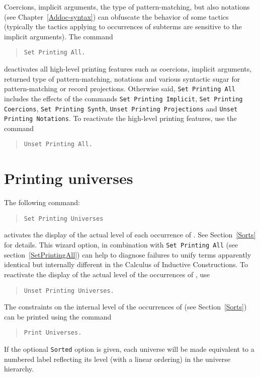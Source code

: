 Coercions, implicit arguments, the type of pattern-matching, but also
notations (see Chapter~\ref{Addoc-syntax}) can obfuscate the behavior
of some tactics (typically the tactics applying to occurrences of
subterms are sensitive to the implicit arguments). The command
\begin{quote}
{\tt Set Printing All.}
\end{quote}
deactivates all high-level printing features such as coercions,
implicit arguments, returned type of pattern-matching, notations and
various syntactic sugar for pattern-matching or record projections.
Otherwise said, {\tt Set Printing All} includes the effects
of the commands {\tt Set Printing Implicit}, {\tt Set Printing
Coercions}, {\tt Set Printing Synth}, {\tt Unset Printing Projections}
and {\tt Unset Printing Notations}.  To reactivate the high-level
printing features, use the command
\begin{quote}
{\tt Unset Printing All.}
\end{quote}

\section[Printing universes]{Printing universes\label{PrintingUniverses}
}

The following command:
\begin{quote}
{\tt Set Printing Universes}
\end{quote}
activates the display of the actual level of each occurrence of
{\Type}. See Section~\ref{Sorts} for details.  This wizard option, in
combination with \texttt{Set Printing All} (see
section~\ref{SetPrintingAll}) can help to diagnose failures to unify
terms apparently identical but internally different in the Calculus of
Inductive Constructions. To reactivate the display of the actual level
of the occurrences of {\Type}, use
\begin{quote}
{\tt Unset Printing Universes.}
\end{quote}


The constraints on the internal level of the occurrences of {\Type}
(see Section~\ref{Sorts}) can be printed using the command
\begin{quote}
{\tt Print  Universes.}
\end{quote}
If the optional {\tt Sorted} option is given, each universe will be
made equivalent to a numbered label reflecting its level (with a
linear ordering) in the universe hierarchy.

